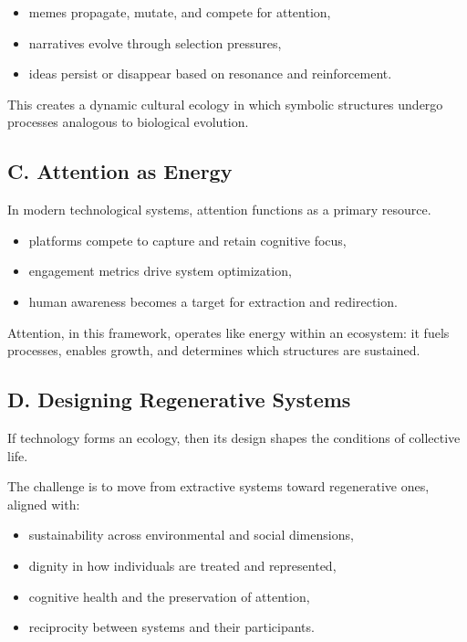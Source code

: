 \documentclass[12pt]{article}
\begin{document}
\begin{itemize}
    \item memes propagate, mutate, and compete for attention,
    \item narratives evolve through selection pressures,
    \item ideas persist or disappear based on resonance and reinforcement.
\end{itemize}

This creates a dynamic cultural ecology in which symbolic structures undergo processes analogous to biological evolution.

\subsection*{C. Attention as Energy}

In modern technological systems, attention functions as a primary resource.

\begin{itemize}
    \item platforms compete to capture and retain cognitive focus,
    \item engagement metrics drive system optimization,
    \item human awareness becomes a target for extraction and redirection.
\end{itemize}

Attention, in this framework, operates like energy within an ecosystem: it fuels processes, enables growth, and determines which structures are sustained.

\subsection*{D. Designing Regenerative Systems}

If technology forms an ecology, then its design shapes the conditions of collective life.

The challenge is to move from extractive systems toward regenerative ones, aligned with:
\begin{itemize}
    \item sustainability across environmental and social dimensions,
    \item dignity in how individuals are treated and represented,
    \item cognitive health and the preservation of attention,
    \item reciprocity between systems and their participants.
\end{itemize}
\end{document}

